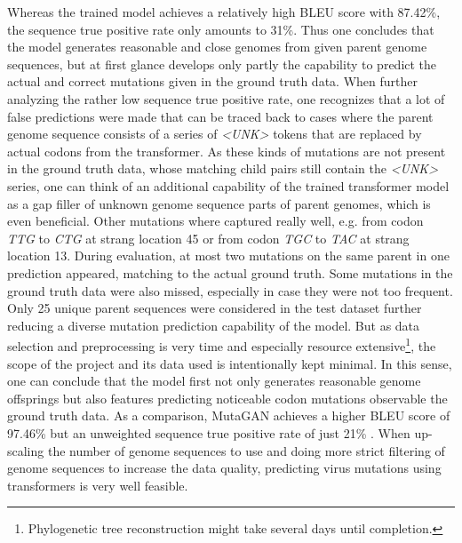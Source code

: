 Whereas the trained model achieves a relatively high \ac{BLEU} score with 87.42\%, the sequence true positive rate only amounts to 31\%. Thus one concludes that the model generates reasonable and close genomes from given parent genome sequences, but at first glance develops only partly the capability to predict the actual and correct mutations given in the ground truth data. When further analyzing the rather low sequence true positive rate, one recognizes that a lot of false predictions were made that can be traced back to cases where the parent genome sequence consists of a series of \textit{<UNK>} tokens that are replaced by actual codons from the transformer. As these kinds of mutations are not present in the ground truth data, whose matching child pairs still contain the \textit{<UNK>} series, one can think of an additional capability of the trained transformer model as a gap filler of unknown genome sequence parts of parent genomes, which is even beneficial. Other mutations where captured really well, e.g. from codon \textit{TTG} to \textit{CTG} at strang location 45 or from codon \textit{TGC} to \textit{TAC} at strang location 13. During evaluation, at most two mutations on the same parent in one prediction appeared, matching to the actual ground truth. Some mutations in the ground truth data were also missed, especially in case they were not too frequent. Only 25 unique parent sequences were considered in the test dataset further reducing a diverse mutation prediction capability of the model. But as data selection and preprocessing is very time and especially resource extensive\footnote{Phylogenetic tree reconstruction might take several days until completion.}, the scope of the project and its data used is intentionally kept minimal. In this sense, one can conclude that the model first not only generates reasonable genome offsprings but also features predicting noticeable codon mutations observable the ground truth data. As a comparison, MutaGAN achieves a higher \ac{BLEU} score of 97.46\% but an unweighted sequence true positive rate of just 21\% \cite{Berman2020}. When up-scaling the number of genome sequences to use and doing more strict filtering of genome sequences to increase the data quality, predicting virus mutations using transformers is very well feasible. 

\newpage

